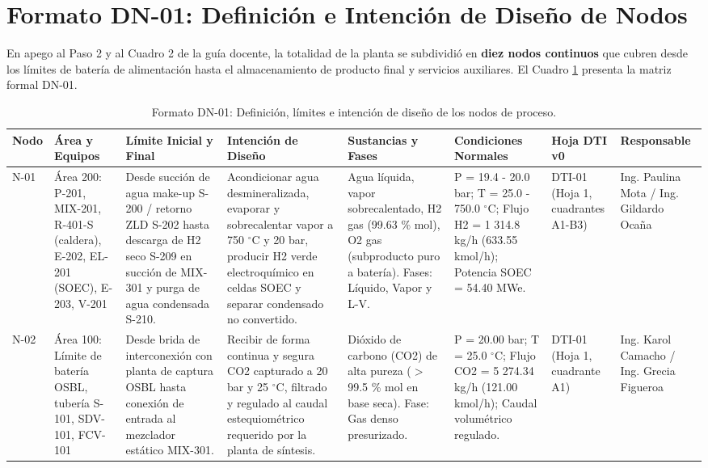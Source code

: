 \documentclass[10pt,letterpaper]{article}
\begin{document}
\section{Formato DN-01: Definición e Intención de Diseño de Nodos}
En apego al Paso 2 y al Cuadro 2 de la guía docente, la totalidad de la planta se subdividió en \textbf{diez nodos continuos} que cubren desde los límites de batería de alimentación hasta el almacenamiento de producto final y servicios auxiliares. El Cuadro \ref{tab:dn01_tabla} presenta la matriz formal DN-01.

\begin{landscape}
\begin{table}[H]
\centering\footnotesize
\caption{Formato DN-01: Definición, límites e intención de diseño de los nodos de proceso.} \label{tab:dn01_tabla}
\begin{tabularx}{\linewidth}{|l|p{2.8cm}|p{3.2cm}|X|p{2.6cm}|p{2.8cm}|p{1.8cm}|p{2.4cm}|}
\hline
\rowcolor{tableheader}\color{white}\textbf{Nodo} & \color{white}\textbf{Área y Equipos} & \color{white}\textbf{Límite Inicial y Final} & \color{white}\textbf{Intención de Diseño} & \color{white}\textbf{Sustancias y Fases} & \color{white}\textbf{Condiciones Normales} & \color{white}\textbf{Hoja DTI v0} & \color{white}\textbf{Responsable} \\ \hline
N-01 & Área 200: P-201, MIX-201, R-401-S (caldera), E-202, EL-201 (SOEC), E-203, V-201 & Desde succión de agua make-up S-200 / retorno ZLD S-202 hasta descarga de H2 seco S-209 en succión de MIX-301 y purga de agua condensada S-210. & Acondicionar agua desmineralizada, evaporar y sobrecalentar vapor a 750 $^\circ$C y 20 bar, producir H2 verde electroquímico en celdas SOEC y separar condensado no convertido. & Agua líquida, vapor sobrecalentado, H2 gas (99.63 \% mol), O2 gas (subproducto puro a batería). Fases: Líquido, Vapor y L-V. & P = 19.4 - 20.0 bar; T = 25.0 - 750.0 $^\circ$C; Flujo H2 = 1 314.8 kg/h (633.55 kmol/h); Potencia SOEC = 54.40 MWe. & DTI-01 (Hoja 1, cuadrantes A1-B3) & Ing. Paulina Mota / Ing. Gildardo Ocaña \\ \hline
N-02 & Área 100: Límite de batería OSBL, tubería S-101, SDV-101, FCV-101 & Desde brida de interconexión con planta de captura OSBL hasta conexión de entrada al mezclador estático MIX-301. & Recibir de forma continua y segura CO2 capturado a 20 bar y 25 $^\circ$C, filtrado y regulado al caudal estequiométrico requerido por la planta de síntesis. & Dióxido de carbono (CO2) de alta pureza ($>$ 99.5 \% mol en base seca). Fase: Gas denso presurizado. & P = 20.00 bar; T = 25.0 $^\circ$C; Flujo CO2 = 5 274.34 kg/h (121.00 kmol/h); Caudal volumétrico regulado. & DTI-01 (Hoja 1, cuadrante A1) & Ing. Karol Camacho / Ing. Grecia Figueroa \\ \hline

\end{tabularx}
\end{table}
\end{landscape}
\end{document}
